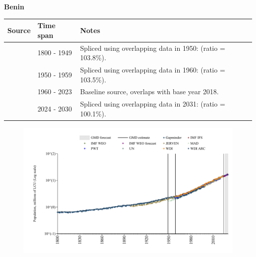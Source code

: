 \documentclass[12pt,a4paper,landscape]{article}
\begin{document}
\begin{adjustbox}{max totalsize={\paperwidth}{\paperheight},center}
\begin{minipage}[t][\textheight][t]{\textwidth}
\vspace*{0.5cm}
{}
\begin{center}
{\Large\bfseries Benin}
\end{center}
\vspace{0.5cm}
\begin{table}[H]
\centering
\small
\begin{tabular}{|l|l|l|}
\hline
\textbf{Source} & \textbf{Time span} & \textbf{Notes} \\
\hline
\rowcolor{white}\cite{Gapminder}& 1800 - 1949 &Spliced using overlapping data in 1950: (ratio = 103.8\%).\\
\rowcolor{lightgray}\cite{IMF_IFS}& 1950 - 1959 &Spliced using overlapping data in 1960: (ratio = 103.5\%).\\
\rowcolor{white}\cite{WDI}& 1960 - 2023 &Baseline source, overlaps with base year 2018.\\
\rowcolor{lightgray}\cite{Gapminder}& 2024 - 2030 &Spliced using overlapping data in 2031: (ratio = 100.1\%).\\
\hline
\end{tabular}
\end{table}
\begin{figure}[H]
\centering
\includegraphics[width=\textwidth,height=0.6\textheight,keepaspectratio]{graphs/BEN_pop.pdf}
\end{figure}
\end{minipage}
\end{adjustbox}
\end{document}
